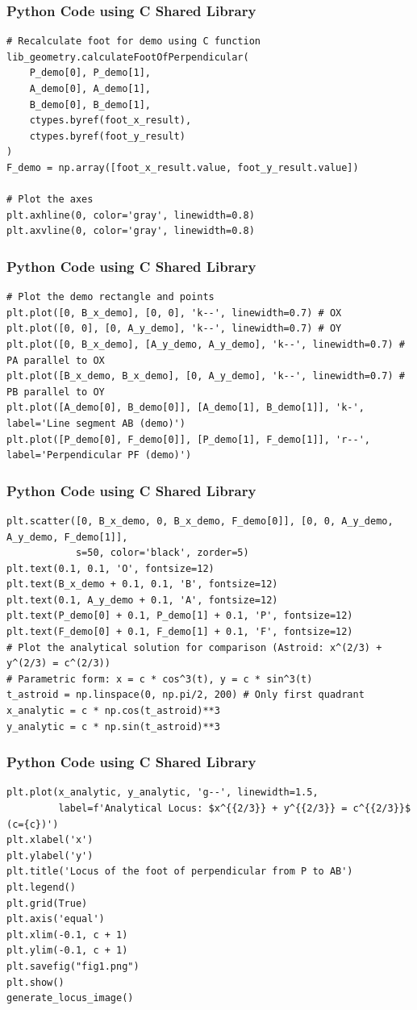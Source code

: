 \documentclass{beamer}
\begin{document}
\begin{frame}[fragile]
\frametitle{Python Code using C Shared Library}
\begin{lstlisting}
# Recalculate foot for demo using C function
lib_geometry.calculateFootOfPerpendicular(
    P_demo[0], P_demo[1],
    A_demo[0], A_demo[1],
    B_demo[0], B_demo[1],
    ctypes.byref(foot_x_result),
    ctypes.byref(foot_y_result)
)
F_demo = np.array([foot_x_result.value, foot_y_result.value])

# Plot the axes
plt.axhline(0, color='gray', linewidth=0.8)
plt.axvline(0, color='gray', linewidth=0.8)
\end{lstlisting}
\end{frame}

\begin{frame}[fragile]
\frametitle{Python Code using C Shared Library}
\begin{lstlisting}
# Plot the demo rectangle and points
plt.plot([0, B_x_demo], [0, 0], 'k--', linewidth=0.7) # OX
plt.plot([0, 0], [0, A_y_demo], 'k--', linewidth=0.7) # OY
plt.plot([0, B_x_demo], [A_y_demo, A_y_demo], 'k--', linewidth=0.7) # PA parallel to OX
plt.plot([B_x_demo, B_x_demo], [0, A_y_demo], 'k--', linewidth=0.7) # PB parallel to OY
plt.plot([A_demo[0], B_demo[0]], [A_demo[1], B_demo[1]], 'k-', label='Line segment AB (demo)')
plt.plot([P_demo[0], F_demo[0]], [P_demo[1], F_demo[1]], 'r--', label='Perpendicular PF (demo)')
\end{lstlisting}
\end{frame}

\begin{frame}[fragile]
\frametitle{Python Code using C Shared Library}
\begin{lstlisting}
plt.scatter([0, B_x_demo, 0, B_x_demo, F_demo[0]], [0, 0, A_y_demo, A_y_demo, F_demo[1]],
            s=50, color='black', zorder=5)
plt.text(0.1, 0.1, 'O', fontsize=12)
plt.text(B_x_demo + 0.1, 0.1, 'B', fontsize=12)
plt.text(0.1, A_y_demo + 0.1, 'A', fontsize=12)
plt.text(P_demo[0] + 0.1, P_demo[1] + 0.1, 'P', fontsize=12)
plt.text(F_demo[0] + 0.1, F_demo[1] + 0.1, 'F', fontsize=12)
# Plot the analytical solution for comparison (Astroid: x^(2/3) + y^(2/3) = c^(2/3))
# Parametric form: x = c * cos^3(t), y = c * sin^3(t)
t_astroid = np.linspace(0, np.pi/2, 200) # Only first quadrant
x_analytic = c * np.cos(t_astroid)**3
y_analytic = c * np.sin(t_astroid)**3
\end{lstlisting}
\end{frame}

\begin{frame}[fragile]
\frametitle{Python Code using C Shared Library}
\begin{lstlisting}
plt.plot(x_analytic, y_analytic, 'g--', linewidth=1.5,
         label=f'Analytical Locus: $x^{{2/3}} + y^{{2/3}} = c^{{2/3}}$ (c={c})')
plt.xlabel('x')
plt.ylabel('y')
plt.title('Locus of the foot of perpendicular from P to AB')
plt.legend()
plt.grid(True)
plt.axis('equal')
plt.xlim(-0.1, c + 1)
plt.ylim(-0.1, c + 1)
plt.savefig("fig1.png")
plt.show()
generate_locus_image()
\end{lstlisting}
\end{frame}
\end{document}
